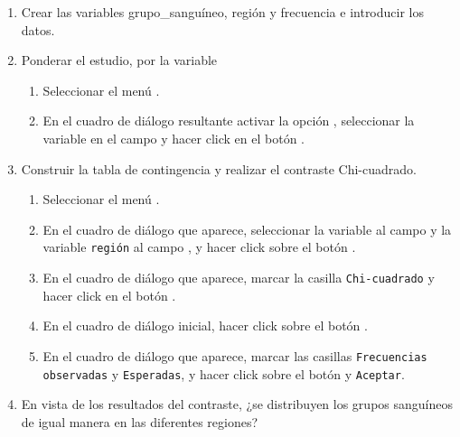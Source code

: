 \begin{enumerate}[leftmargin=*]
\begin{enumerate}
\item Crear las variables \textsf{grupo\_sanguíneo},
\textsf{región} y \textsf{frecuencia} e introducir los datos.
\item Ponderar el estudio, por la variable 
\begin{indicacion}
\begin{enumerate}
\item Seleccionar el menú .
\item En el cuadro de diálogo resultante activar la opción , seleccionar la variable  en el campo  y hacer click en el botón .
\end{enumerate}
\end{indicacion}

\item Construir la tabla de contingencia y realizar el contraste Chi-cuadrado.
\begin{indicacion}
\begin{enumerate}
\item Seleccionar el menú .
\item En el cuadro de diálogo que aparece, seleccionar la variable  al campo  y la variable \texttt{región} al campo , y hacer click sobre el botón .
\item En el cuadro de diálogo que aparece, marcar la casilla \texttt{Chi-cuadrado} y hacer click en el botón .
\item En el cuadro de diálogo inicial, hacer click sobre el botón .
\item En el cuadro de diálogo que aparece, marcar las casillas \texttt{Frecuencias observadas} y \texttt{Esperadas}, y hacer click sobre el botón  y \texttt{Aceptar}.
\end{enumerate}
\end{indicacion}

\item En vista de los resultados del contraste, ¿se distribuyen los grupos sanguíneos de igual manera en las
diferentes regiones?
\end{enumerate}


\end{enumerate}
